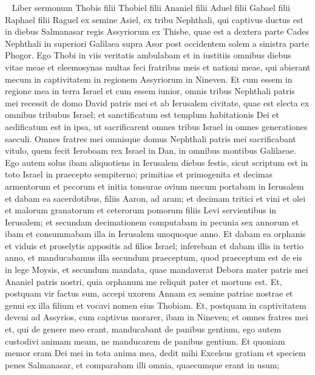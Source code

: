
\begin{biblechapter}   
\verse Liber sermonum Thobis filii Thobiel filii Ananiel filii Aduel filii Gabael filii Raphael filii Raguel ex semine Asiel, ex tribu Nephthali, 
\verse qui captivus ductus est in diebus Salmanasar regis Assyriorum ex Thisbe, quae est a dextera parte Cades Nephthali in superiori Galilaea supra Asor post occidentem solem a sinistra parte Phogor. 
\verse Ego Thobi in viis veritatis ambulabam et in iustitiis omnibus diebus vitae meae et eleemosynas multas feci fratribus meis et nationi meae, qui abierant mecum in captivitatem in regionem Assyriorum in Nineven. 
\verse Et cum essem in regione mea in terra Israel et cum essem iunior, omnis tribus Nephthali patris mei recessit de domo David patris mei et ab Ierusalem civitate, quae est electa ex omnibus tribubus Israel; et sanctificatum est templum habitationis Dei et aedificatum est in ipsa, ut sacrificarent omnes tribus Israel in omnes generationes saeculi. 
\verse Omnes fratres mei omnisque domus Nephthali patris mei sacrificabant vitulo, quem fecit Ieroboam rex Israel in Dan, in omnibus montibus Galilaeae. 
\verse Ego autem solus ibam aliquotiens in Ierusalem diebus festis, sicut scriptum est in toto Israel in praecepto sempiterno; primitias et primogenita et decimas armentorum et pecorum et initia tonsurae ovium mecum portabam in Ierusalem 
\verse et dabam ea sacerdotibus, filiis Aaron, ad aram; et decimam tritici et vini et olei et malorum granatorum et ceterorum pomorum filiis Levi servientibus in Ierusalem; et secundam decimationem computabam in pecunia sex annorum et ibam et consummabam illa in Ierusalem unoquoque anno.  
\verse Et dabam ea orphanis et viduis et proselytis appositis ad filios Israel; inferebam et dabam illis in tertio anno, et manducabamus illa secundum praeceptum, quod praeceptum est de eis in lege Moysis, et secundum mandata, quae mandaverat Debora mater patris mei Ananiel patris nostri, quia orphanum me reliquit pater et mortuus est. 
\verse Et, postquam vir factus sum, accepi uxorem Annam ex semine patriae nostrae et genui ex illa filium et vocavi nomen eius Thobiam. 
\verse Et, postquam in captivitatem deveni ad Assyrios, cum captivus morarer, ibam in Nineven; et omnes fratres mei et, qui de genere meo erant, manducabant de panibus gentium, 
\verse ego autem custodivi animam meam, ne manducarem de panibus gentium. 
\verse Et quoniam memor eram Dei mei in tota anima mea, 
\verse dedit mihi Excelsus gratiam et speciem penes Salmanasar, et comparabam illi omnia, quaecumque erant in usum; 

\end{biblechapter}
